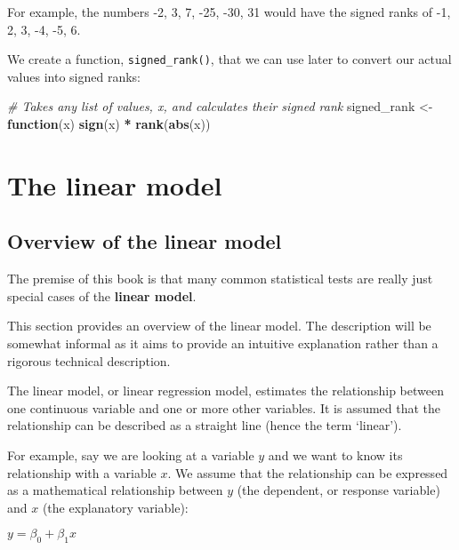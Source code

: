 \documentclass[
  12pt,
]{krantz}
\newenvironment{Shaded}{\begin{snugshade}}{\end{snugshade}}
\newcommand{\CommentTok}[1]{\textcolor[rgb]{0.56,0.35,0.01}{\textit{#1}}}
\newcommand{\ControlFlowTok}[1]{\textcolor[rgb]{0.13,0.29,0.53}{\textbf{#1}}}
\newcommand{\KeywordTok}[1]{\textcolor[rgb]{0.13,0.29,0.53}{\textbf{#1}}}
\newcommand{\NormalTok}[1]{#1}
\newcommand{\OperatorTok}[1]{\textcolor[rgb]{0.81,0.36,0.00}{\textbf{#1}}}
\newcommand{\StringTok}[1]{\textcolor[rgb]{0.31,0.60,0.02}{#1}}
\begin{document}
For example, the numbers -2, 3, 7, -25, -30, 31 would have the signed ranks of -1, 2, 3, -4, -5, 6.

We create a function, \texttt{signed\_rank()}, that we can use later to convert our actual values into signed ranks:

\begin{Shaded}
\begin{Highlighting}[]
\CommentTok{\# Takes any list of values, x, and calculates their signed rank}
\NormalTok{signed\_rank \textless{}{-}}\StringTok{ }\ControlFlowTok{function}\NormalTok{(x) }\KeywordTok{sign}\NormalTok{(x) }\OperatorTok{*}\StringTok{ }\KeywordTok{rank}\NormalTok{(}\KeywordTok{abs}\NormalTok{(x))}
\end{Highlighting}
\end{Shaded}

\hypertarget{linearmodel}{%
\chapter{The linear model}\label{linearmodel}}

\hypertarget{overview-of-the-linear-model}{%
\section{Overview of the linear model}\label{overview-of-the-linear-model}}

The premise of this book is that many common statistical tests are really just special cases of the \textbf{linear model}.

This section provides an overview of the linear model. The description will be somewhat informal as it aims to provide an intuitive explanation rather than a rigorous technical description.

The linear model, or linear regression model, estimates the relationship between one continuous variable and one or more other variables. It is assumed that the relationship can be described as a straight line (hence the term `linear').

For example, say we are looking at a variable \(y\) and we want to know its relationship with a variable \(x\). We assume that the relationship can be expressed as a mathematical relationship between \(y\) (the dependent, or response variable) and \(x\) (the explanatory variable):

\begin{center}

\(y = \beta_0 + \beta_1 x\)

\end{center}
\end{document}
